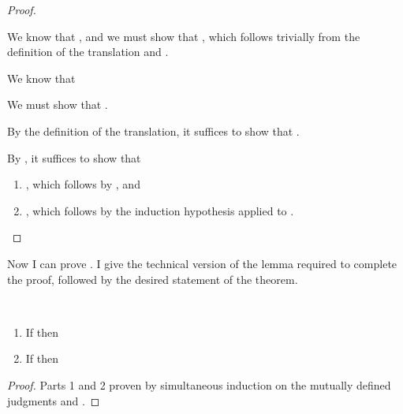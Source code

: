 {\begin{proof}
\begin{proofcases}
    \item {}

      We know that , and we must show that
      , which
      follows trivially from the definition of the translation and
      .

    \item {}

      We know that \im{
        \inferrule*[right=\rulename{\im{\subtypesym}-Pi}]
      {\sequivjudg{\slenv}{\sAone}{\sAtwo} \\
       \ssubtyjudg{\slenv,\sxone:\sAtwo}{\sBone}{\subst{\sBtwo}{\sxone}{\sxtwo}}}
      {\ssubtyjudg{\slenv}{\spity{\sxone}{\sAone}{\sBone}}{\spity{\sxtwo}{\sAtwo}{\sBtwo}}}
        }

      We must show that \im{\cctrans{\spity{\sxone}{\sAone}{\sBone}} \subtypesym  \cctrans{\spity{\sxtwo}{\sAtwo}{\sBtwo}}}.

      By the definition of the translation, it suffices to show that
      \im{\tpity{\txone}{\cctrans{\sAone}}{\cctrans{\sBone}} \subtypesym \tpity{\txtwo}{\cctrans{\sAtwo}}{\cctrans{\sBtwo}}}.

      By , it suffices to show that
      \begin{enumerate}
      \item \im{\cctrans{\sAone} \equiv \cctrans{\sAtwo}}, which follows by
        , and

      \item \im{\cctrans{\sBone} \subtypesym \cctrans{\sBtwo}}, which follows by
        the induction hypothesis applied to \im{\sBone \subtypesym \sBtwo}.
      \end{enumerate}
  \end{proofcases}
\end{proof}

Now I can prove .
I give the technical version of the lemma required to complete the proof,
followed by the desired statement of the theorem.
\begin{lemma}
  \label{lem:abs-cc:cc:type-pres}
  ~
  \begin{enumerate}
    \item If \im{\swf{\slenv}} then \im{\twf{\cctrans{\slenv}}}
    \item If \im{\styjudg{\slenv}{\se}{\sA}} then \inlinemath{\ttyjudg{\cctrans{\slenv}}{\cctrans{\se}}{\cctrans{\sA}}}
  \end{enumerate}
\end{lemma}
\begin{proof}
  Parts 1 and 2 proven by simultaneous induction on the mutually defined judgments
    \im{\swf{\slenv}} and \im{\styjudg{\slenv}{\se}{\sA}}.


\end{proof}}
